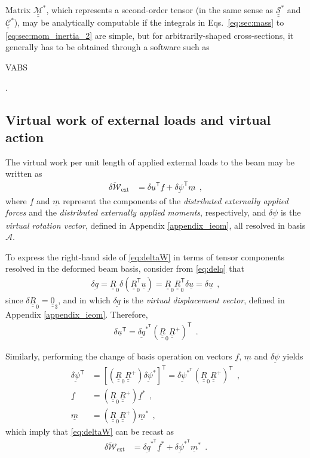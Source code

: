 \documentclass[12pt,a4paper,oneside,english]{abntex2} %
\newcommand{\fix}[1]{{\color{red}#1}}
\newcommand{\vect}[1]{\underline{#1}}
\def\tens#1{\underline{\underline{#1}}}
\def\lb{\left[}
\def\rb{\right]}
\def\lp{\left(}
\def\rp{\right)}
\def\T{\mathsf{T}}
\def\A{\mathcal{A}}
\def\zthree{\tens{0}_3}
\def\R{\tens{R}}
\def\Rp{\R^+}
\def\Rz{\R_0}
\def\RzT{\R^\T_0}
\def\u{\vect{u}}
\def\uT{\u^\T}
\def\f{\vect{f}}
\def\fs{\f^*}
\def\m{\vect{m}}
\def\ms{\m^*}
\def\delq{\vect{\delta q}}
\def\delqsT{\delq^{*^\T}}
\def\delpsi{\vect{\delta\psi}}
\def\delpsiT{\delpsi^\T}
\def\delpsis{\delpsi^*}
\def\delpsisT{\delpsi^{*^\T}}
\def\Stiff{\mathcal{\tens{S}}^*}
\def\Compliance{\mathcal{\tens{C}}^*}
\def\Mass{\mathcal{\tens{M}}^*}
\def\deltaW{\overline{\delta\mathcal{W}}_{\text{ext}}}
\begin{document}
Matrix $\Mass$, which represents a \fix{second-order tensor (in the same sense as $\Stiff$ and $\Compliance$)}, may be analytically computable if the integrals in Eqs.~\eqref{eq:sec:mass} to \eqref{eq:sec:mom_inertia_2} are simple, but for arbitrarily-shaped cross-sections, it generally has to be obtained through a software such as \begin{small}VABS\end{small}.

\subsection{Virtual work of external loads and virtual action} 
\label{subsec:virtual}

The virtual work per unit length of applied external loads to the beam may be written as
\begin{align}                                 
  \deltaW &= 
  \delta\uT\f + \delpsiT\m \ \ ,
  \label{eq:deltaW} 
\end{align} 
where $\f$ and $\m$ represent the components of the \textit{distributed externally applied forces} and the \textit{distributed externally applied moments}, respectively, and $\delpsi$ is the \textit{virtual rotation vector}, defined in Appendix \ref{appendix_ieom}, all resolved in basis $\A$.

To express the right-hand side of \cref{eq:deltaW} in terms of tensor components resolved in the deformed beam basis, consider from \cref{eq:delq} that
\begin{align}                                           
    \delq = \Rz\delta\lp\RzT\u\rp =                     \Rz\RzT\delta\u = \delta\u \ \ ,
     \label{eq:deltaq_expand} 
\end{align}
since $\delta\Rz = \zthree$, and in which $\delq$ is the \textit{virtual displacement vector}, defined in Appendix \ref{appendix_ieom}. Therefore,
\begin{align}                                           \delta\uT = \delqsT\lp\Rz\Rp\rp^\T \ \ .
    \label{eq:deltau} 
\end{align}

Similarly, performing the change of basis operation on vectors $\f$, $\m$ and $\delpsi$ yields
\begin{equation}
    \begin{aligned}                      
    \delpsiT &= \lb\lp\Rz\Rp\rp\delpsis\rb^\T =  \delpsisT\lp\Rz\Rp\rp^\T \ \ ,
      \\
      \f &= \lp\Rz\Rp\rp\fs \ \ ,
      \\
      \m &= \lp\Rz\Rp\rp\ms \ \ ,
      \label{eq:delpsiT_f_m}
    \end{aligned}
\end{equation}
which imply that \cref{eq:deltaW} can be recast as
\begin{align}                                           \deltaW &= \delqsT\fs + \delpsisT\ms \ \ .
    \label{eq:deltaWs} 
\end{align} 
\end{document}
